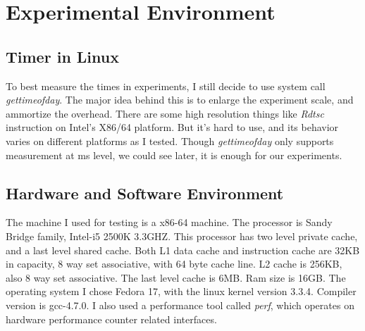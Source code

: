\section{Experimental Environment}
	\label{sec:timing}
\subsection{Timer in Linux}
To best measure the times in experiments, I still decide to use system call
\emph{gettimeofday}. The major idea behind this is to enlarge the experiment
scale, and ammortize the overhead. There are some high resolution things like
\emph{Rdtsc} instruction on Intel's X86/64 platform. But it's hard to use, and
its behavior varies on different platforms as I tested. Though
\emph{gettimeofday} only supports measurement at ms level, we could see later,
it is enough for our experiments.

\subsection{Hardware and Software Environment}
The machine I used for testing is a x86-64 machine. The processor is Sandy
Bridge family, Intel-i5 2500K 3.3GHZ. This processor has two level private
cache, and a last level shared cache. Both L1 data cache and instruction cache
are 32KB in capacity, 8 way set associative, with 64 byte cache line. L2 cache
is 256KB, also 8 way set associative. The last level cache is 6MB. Ram size is
16GB. The operating system I chose Fedora 17, with the linux kernel version
3.3.4. Compiler version is gcc-4.7.0. I also used a performance tool called
\emph{perf}, which operates on hardware performance counter related interfaces.

